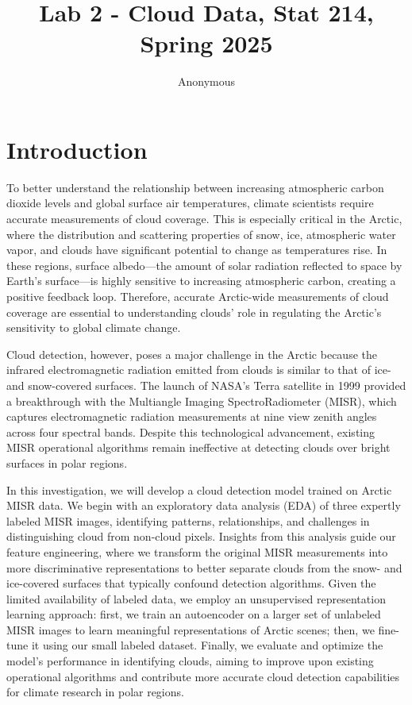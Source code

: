 \documentclass[10pt,letterpaper]{article}
\title{Lab 2 - Cloud Data, Stat 214, Spring 2025}
\author{Anonymous}
\begin{document}
\maketitle

\section{Introduction}

To better understand the relationship between increasing atmospheric carbon dioxide levels and global surface air temperatures, climate scientists require accurate measurements of cloud coverage. This is especially critical in the Arctic, where the distribution and scattering properties of snow, ice, atmospheric water vapor, and clouds have significant potential to change as temperatures rise. In these regions, surface albedo—the amount of solar radiation reflected to space by Earth's surface—is highly sensitive to increasing atmospheric carbon, creating a positive feedback loop. Therefore, accurate Arctic-wide measurements of cloud coverage are essential to understanding clouds' role in regulating the Arctic's sensitivity to global climate change.

Cloud detection, however, poses a major challenge in the Arctic because the infrared electromagnetic radiation emitted from clouds is similar to that of ice- and snow-covered surfaces. The launch of NASA's Terra satellite in 1999 provided a breakthrough with the Multiangle Imaging SpectroRadiometer (MISR), which captures electromagnetic radiation measurements at nine view zenith angles across four spectral bands. Despite this technological advancement, existing MISR operational algorithms remain ineffective at detecting clouds over bright surfaces in polar regions.

In this investigation, we will develop a cloud detection model trained on Arctic MISR data. We begin with an exploratory data analysis (EDA) of three expertly labeled MISR images, identifying patterns, relationships, and challenges in distinguishing cloud from non-cloud pixels. Insights from this analysis guide our feature engineering, where we transform the original MISR measurements into more discriminative representations to better separate clouds from the snow- and ice-covered surfaces that typically confound detection algorithms. Given the limited availability of labeled data, we employ an unsupervised representation learning approach: first, we train an autoencoder on a larger set of unlabeled MISR images to learn meaningful representations of Arctic scenes; then, we fine-tune it using our small labeled dataset. Finally, we evaluate and optimize the model's performance in identifying clouds, aiming to improve upon existing operational algorithms and contribute more accurate cloud detection capabilities for climate research in polar regions.
\end{document}

